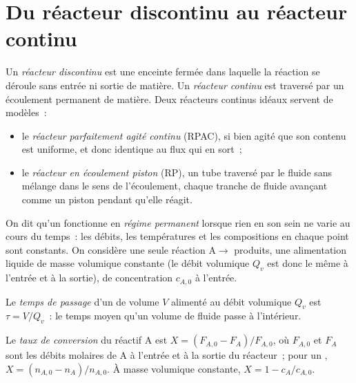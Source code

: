 \section{Du réacteur discontinu au réacteur continu}

\begin{definition}\label{def:b2:continuous-reactors:reactors}
Un \emph{réacteur discontinu} est une enceinte fermée dans laquelle la
réaction se déroule sans entrée ni sortie de matière. Un
\emph{réacteur continu} est traversé par un écoulement
permanent de matière. Deux réacteurs continus idéaux servent de modèles~:
\begin{itemize}
  \item le \emph{réacteur parfaitement agité continu}
(RPAC), si bien agité que son contenu est
        uniforme, et donc identique au flux qui en sort~;
  \item le \emph{réacteur en écoulement piston} (RP), un tube
        traversé par le fluide sans mélange dans le sens de l'écoulement, chaque tranche de
        fluide avançant comme un piston pendant qu'elle réagit.
\end{itemize}
\end{definition}

On dit qu'un  fonctionne en \emph{régime permanent} lorsque
rien en son sein ne varie au cours du temps~: les débits, les températures et les
compositions en chaque point sont constants. On considère une seule réaction
$\mathrm A \to$ produits, une alimentation liquide de masse volumique constante (le
débit volumique $Q_v$ est donc le même à l'entrée et à la sortie), de
concentration $c_{A,0}$ à l'entrée.

\begin{definition}\label{def:b2:continuous-reactors:residence-time}
Le \emph{temps de passage} d'un  de
volume $V$ alimenté au débit volumique $Q_v$ est $\tau = V/Q_v$~: le temps
moyen qu'un volume de fluide passe à l'intérieur.
\end{definition}

\begin{definition}\label{def:b2:continuous-reactors:conversion}
Le \emph{taux de conversion} du réactif A est $X = (F_{A,0} -
F_A)/F_{A,0}$, où $F_{A,0}$ et $F_A$ sont les débits molaires de A
à l'entrée et à la sortie du réacteur~; pour un , $X = (n_{A,0} -
n_A)/n_{A,0}$. À masse volumique constante, $X = 1 - c_A/c_{A,0}$.
\end{definition}


